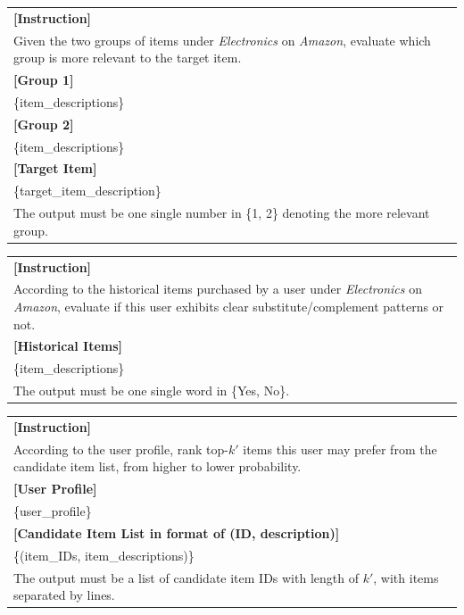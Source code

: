 \begin{promptbox}
\small
\begin{tabularx}{\linewidth}{X}
\toprule
\textbf{[Instruction]}\\
Given the two groups of items under \emph{Electronics} on \emph{Amazon}, evaluate which group is more relevant to the target item.\\[0.4em]
\textbf{[Group 1]}\\
\{item\_descriptions\}\\[0.4em]
\textbf{[Group 2]}\\
\{item\_descriptions\}\\[0.4em]
\textbf{[Target Item]}\\
\{target\_item\_description\}\\[0.4em]
The output must be one single number in \{1, 2\} denoting the more relevant group.\\
\bottomrule
\end{tabularx}
\end{promptbox}
\label{app:tab:dcm}
\medskip

\begin{promptbox}
\small
\begin{tabularx}{\linewidth}{X}
\toprule
\textbf{[Instruction]}\\
According to the historical items purchased by a user under \emph{Electronics} on \emph{Amazon}, evaluate if this user exhibits clear substitute/complement patterns or not.\\[0.4em]
\textbf{[Historical Items]}\\
\{item\_descriptions\}\\[0.4em]
The output must be one single word in \{Yes, No\}.\\
\bottomrule
\end{tabularx}
\end{promptbox}
\label{app:tab:dcm_reg}
\medskip

\begin{promptbox}
\small
\begin{tabularx}{\linewidth}{X}
\toprule
\textbf{[Instruction]}\\
According to the user profile, rank top-\emph{$k'$} items this user may prefer from the candidate item list, from higher to lower probability.\\[0.4em]
\textbf{[User Profile]}\\
\{user\_profile\}\\[0.4em]
\textbf{[Candidate Item List in format of (ID, description)]}\\
\{(item\_IDs, item\_descriptions)\}\\[0.4em]
The output must be a list of candidate item IDs with length of \emph{$k'$}, with items separated by lines.\\
\bottomrule
\end{tabularx}
\end{promptbox}
\label{app:tab:rank_reg}
\medskip

